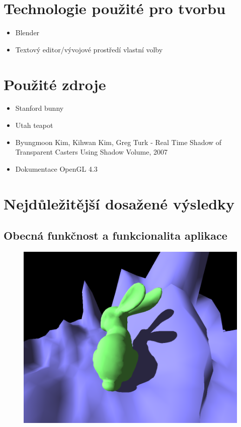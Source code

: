 \documentclass[11pt,a4paper]{article}
\begin{document}
\section{Technologie použité pro tvorbu}
\begin{itemize}
	\item Blender
	\item Textový editor/vývojové prostředí vlastní volby
\end{itemize}

\section{Použité zdroje}
\begin{itemize}
	\item Stanford bunny
	\item Utah teapot
	\item Byungmoon Kim, Kihwan Kim, Greg Turk - Real Time Shadow of Transparent Casters Using Shadow Volume, 2007
	\item Dokumentace OpenGL 4.3
\end{itemize}
\section{Nejdůležitější dosažené výsledky}

\subsection{Obecná funkčnost a funkcionalita aplikace}
\begin{figure}[h]
	\captionsetup{type=figure}
	\includegraphics[width=\textwidth]{images/bunny.png}
\end{figure}
\end{document}

